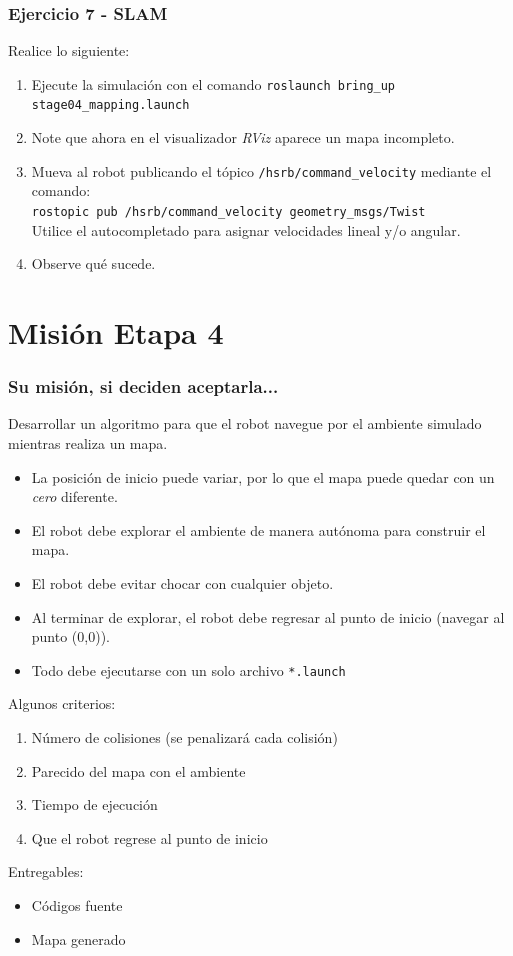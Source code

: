 \documentclass[10pt,spanish,aspectratio=1610]{beamer}
\begin{document}
\begin{frame}[containsverbatim]\frametitle{Ejercicio 7 - SLAM}
Realice lo siguiente:
  \begin{enumerate}
  \item Ejecute la simulación con el comando \texttt{roslaunch bring\_up stage04\_mapping.launch}
  \item Note que ahora en el visualizador \textit{RViz} aparece un mapa incompleto. 
  \item Mueva al robot publicando el tópico \texttt{/hsrb/command\_velocity} mediante el comando:\\
    \texttt{rostopic pub /hsrb/command\_velocity geometry\_msgs/Twist }\\
    Utilice el autocompletado para asignar velocidades lineal y/o angular. 
  \item Observe qué sucede. 
  \end{enumerate}
\end{frame}

\section{Misión Etapa 4}
\begin{frame}\frametitle{Su misión, si deciden aceptarla...}
  Desarrollar un algoritmo para que el robot navegue por el ambiente simulado mientras realiza un mapa. 
  \begin{itemize}
  \item La posición de inicio puede variar, por lo que el mapa puede quedar con un \textit{cero} diferente.
  \item El robot debe explorar el ambiente de manera autónoma para construir el mapa.
  \item El robot debe evitar chocar con cualquier objeto.
  \item Al terminar de explorar, el robot debe regresar al punto de inicio (navegar al punto (0,0)).
  \item Todo debe ejecutarse con un solo archivo \texttt{*.launch}
  \end{itemize}
  Algunos criterios:
  \begin{enumerate}
  \item Número de colisiones (se penalizará cada colisión)
  \item Parecido del mapa con el ambiente
  \item Tiempo de ejecución
  \item Que el robot regrese al punto de inicio
  \end{enumerate}
  Entregables:
  \begin{itemize}
  \item Códigos fuente
  \item Mapa generado 
  \end{itemize}
\end{frame}
\end{document}
